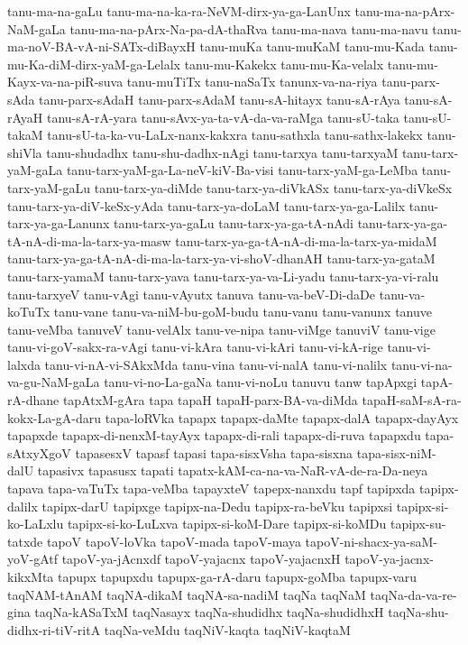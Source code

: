 {tanu-ma-na-gaLu
tanu-ma-na-ka-ra-NeVM-dirx-ya-ga-LanUnx
tanu-ma-na-pArx-NaM-gaLa
tanu-ma-na-pArx-Na-pa-dA-thaRva
tanu-ma-nava
tanu-ma-navu
tanu-ma-noV-BA-vA-ni-SATx-diBayxH
tanu-muKa
tanu-muKaM
tanu-mu-Kada
tanu-mu-Ka-diM-dirx-yaM-ga-Lelalx
tanu-mu-Kakekx
tanu-mu-Ka-velalx
tanu-mu-Kayx-va-na-piR-suva
tanu-muTiTx
tanu-naSaTx
tanunx-va-na-riya
tanu-parx-sAda
tanu-parx-sAdaH
tanu-parx-sAdaM
tanu-sA-hitayx
tanu-sA-rAya
tanu-sA-rAyaH
tanu-sA-rA-yara
tanu-sAvx-ya-ta-vA-da-va-raMga
tanu-sU-taka
tanu-sU-takaM
tanu-sU-ta-ka-vu-LaLx-nanx-kakxra
tanu-sathxla
tanu-sathx-lakekx
tanu-shiVla
tanu-shudadhx
tanu-shu-dadhx-nAgi
tanu-tarxya
tanu-tarxyaM
tanu-tarx-yaM-gaLa
tanu-tarx-yaM-ga-La-neV-kiV-Ba-visi
tanu-tarx-yaM-ga-LeMba
tanu-tarx-yaM-gaLu
tanu-tarx-ya-diMde
tanu-tarx-ya-diVkASx
tanu-tarx-ya-diVkeSx
tanu-tarx-ya-diV-keSx-yAda
tanu-tarx-ya-doLaM
tanu-tarx-ya-ga-Lalilx
tanu-tarx-ya-ga-Lanunx
tanu-tarx-ya-gaLu
tanu-tarx-ya-ga-tA-nAdi
tanu-tarx-ya-ga-tA-nA-di-ma-la-tarx-ya-masw
tanu-tarx-ya-ga-tA-nA-di-ma-la-tarx-ya-midaM
tanu-tarx-ya-ga-tA-nA-di-ma-la-tarx-ya-vi-shoV-dhanAH
tanu-tarx-ya-gataM
tanu-tarx-yamaM
tanu-tarx-yava
tanu-tarx-ya-va-Li-yadu
tanu-tarx-ya-vi-ralu
tanu-tarxyeV
tanu-vAgi
tanu-vAyutx
tanuva
tanu-va-beV-Di-daDe
tanu-va-koTuTx
tanu-vane
tanu-va-niM-bu-goM-budu
tanu-vanu
tanu-vanunx
tanuve
tanu-veMba
tanuveV
tanu-velAlx
tanu-ve-nipa
tanu-viMge
tanuviV
tanu-vige
tanu-vi-goV-sakx-ra-vAgi
tanu-vi-kAra
tanu-vi-kAri
tanu-vi-kA-rige
tanu-vi-lalxda
tanu-vi-nA-vi-SAkxMda
tanu-vina
tanu-vi-nalA
tanu-vi-nalilx
tanu-vi-na-va-gu-NaM-gaLa
tanu-vi-no-La-gaNa
tanu-vi-noLu
tanuvu
tanw
tapApxgi
tapA-rA-dhane
tapAtxM-gAra
tapa
tapaH
tapaH-parx-BA-va-diMda
tapaH-saM-sA-ra-kokx-La-gA-daru
tapa-loRVka
tapapx
tapapx-daMte
tapapx-dalA
tapapx-dayAyx
tapapxde
tapapx-di-nenxM-tayAyx
tapapx-di-rali
tapapx-di-ruva
tapapxdu
tapa-sAtxyXgoV
tapasesxV
tapasf
tapasi
tapa-sisxVsha
tapa-sisxna
tapa-sisx-niM-dalU
tapasivx
tapasusx
tapati
tapatx-kAM-ca-na-va-NaR-vA-de-ra-Da-neya
tapava
tapa-vaTuTx
tapa-veMba
tapayxteV
tapepx-nanxdu
tapf
tapipxda
tapipx-dalilx
tapipx-darU
tapipxge
tapipx-na-Dedu
tapipx-ra-beVku
tapipxsi
tapipx-si-ko-LaLxlu
tapipx-si-ko-LuLxva
tapipx-si-koM-Dare
tapipx-si-koMDu
tapipx-su-tatxde
tapoV
tapoV-loVka
tapoV-mada
tapoV-maya
tapoV-ni-shacx-ya-saM-yoV-gAtf
tapoV-ya-jAcnxdf
tapoV-yajacnx
tapoV-yajacnxH
tapoV-ya-jacnx-kikxMta
tapupx
tapupxdu
tapupx-ga-rA-daru
tapupx-goMba
tapupx-varu
taqNAM-tAnAM
taqNA-dikaM
taqNA-sa-nadiM
taqNa
taqNaM
taqNa-da-va-re-gina
taqNa-kASaTxM
taqNasayx
taqNa-shudidhx
taqNa-shudidhxH
taqNa-shu-didhx-ri-tiV-ritA
taqNa-veMdu
taqNiV-kaqta
taqNiV-kaqtaM
}

